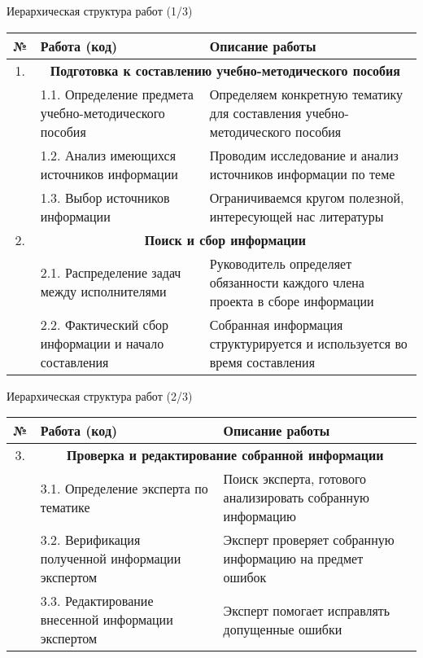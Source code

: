 \documentclass{beamer}
\begin{document}
 \begin{frame}{Иерархическая структура работ (1/3)}
 	\scriptsize
 	\setlength{\tabcolsep}{4pt}
 	\renewcommand{\arraystretch}{1.3}
 	
 	\begin{longtable}{|c| p{4cm}|p{7cm}|}
 		\hline
 		\textbf{№} & \textbf{Работа (код)} & \textbf{Описание работы} \\ \hline
1.&\multicolumn{2}{|c|}{\textbf{ Подготовка к составлению учебно-методического пособия}} \\ \cline{2-3}
 		& 1.1. Определение предмета учебно-методического пособия & Определяем конкретную тематику для составления учебно-методического пособия \\ \cline{2-3}
 		& 1.2. Анализ имеющихся источников информации & Проводим исследование и анализ источников информации по теме \\ \cline{2-3}
 		& 1.3. Выбор источников информации & Ограничиваемся кругом полезной, интересующей нас литературы \\ \hline
 		2. & \multicolumn{2}{|c|}{\textbf{Поиск и сбор информации} } \\ \cline{2-3}
 		& 2.1. Распределение задач между исполнителями & Руководитель определяет обязанности каждого члена проекта в сборе информации \\ \cline{2-3}
 		& 2.2. Фактический сбор информации и начало составления & Собранная информация структурируется и используется во время составления \\ \hline
 	\end{longtable}
 \end{frame}
 

 \begin{frame}{Иерархическая структура работ (2/3)}
 	\scriptsize
 	\setlength{\tabcolsep}{4pt}
 	\renewcommand{\arraystretch}{1.3}
 	
 	\begin{longtable}{|c|p{4cm}|p{7cm}|}
 		\hline
 		\textbf{№} & \textbf{Работа (код)} & \textbf{Описание работы} \\ \hline
 		3. & \multicolumn{2}{|c|}{\textbf{Проверка и редактирование собранной информации}}  \\ \cline{2-3}
 		& 3.1. Определение эксперта по тематике & Поиск эксперта, готового анализировать собранную информацию \\ \cline{2-3}
 		& 3.2. Верификация полученной информации экспертом & Эксперт проверяет собранную информацию на предмет ошибок \\ \cline{2-3}
 		& 3.3. Редактирование внесенной информации экспертом & Эксперт помогает исправлять допущенные ошибки \\ \hline
 	\end{longtable}
 \end{frame}
 
\end{document}
